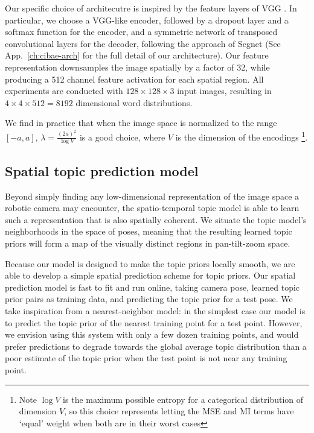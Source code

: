 Our specific choice of architecutre is inspired by the feature layers of VGG \citep{Simonyan14c}. In particular, we choose a VGG-like encoder, followed by a dropout layer and a softmax function for the encoder, and a symmetric network of transposed convolutional layers for the decoder, following the approach of Segnet \citep{BadrinarayananK15} (See App.~\ref{ch:cibae-arch} for the full detail of our architecture). Our feature representation downsamples the image spatially by a factor of 32, while producing a 512 channel feature activation for each spatial region. All experiments are conducted with $128 \times 128 \times 3$ input images, resulting in $4 \times 4 \times 512 = 8192$ dimensional word distributions.

We find in practice that when the image space is normalized to the range $[-a,a]$, $\lambda = \frac{(2a)^2}{\log V}$ is a good choice, where $V$ is the dimension of the encodings \footnote{Note $\log V$ is the maximum possible entropy for a categorical distribution of dimension $V$, so this choice represents letting the MSE and MI terms have `equal' weight when both are in their worst cases}.

\subsection{Spatial topic prediction model}

Beyond simply finding any low-dimensional representation of the image space a robotic camera may encounter, the spatio-temporal topic model is able to learn such a representation that is also spatially coherent. We situate the topic model's neighborhoods in the space of poses, meaning that the resulting learned topic priors will form a map of the visually distinct regions in pan-tilt-zoom space.

Because our model is designed to make the topic priors locally smooth, we are able to develop a simple spatial prediction scheme for topic priors. Our spatial prediction model is fast to fit and run online, taking camera pose, learned topic prior pairs as training data, and predicting the topic prior for a test pose. We take inspiration from a nearest-neighbor model: in the simplest case our model is to predict the topic prior of the nearest training point for a test point. However, we envision using this system with only a few dozen training points, and would prefer predictions to degrade towards the global average topic distribution than a poor estimate of the topic prior when the test point is not near any training point.


